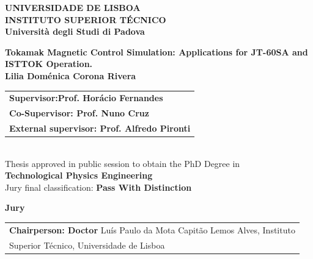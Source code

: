 {%
\centering %
\vspace{-0.5cm}
{\FontL \textbf{UNIVERSIDADE DE LISBOA}} \\
\vspace{10pt}
{\FontL \textbf{INSTITUTO SUPERIOR T\'{E}CNICO}} \\
\vspace{0.7mm}
{\FontM \textbf{Universit\`{a} degli Studi di Padova}} \\
\vspace{0.5cm}

{\FontXL \textbf{Tokamak Magnetic Control Simulation: Applications for JT-60SA and ISTTOK Operation.}} \\

\vspace{0.5cm}
{\FontNam \textbf{Lilia Dom\'enica Corona Rivera}} \\
\vspace{0.7cm}
{\FontS %
	\begin{tabular}{l}
		\FontL
		\textbf{Supervisor:Prof. Hor\'acio Fernandes} \\
		\FontL\textbf{Co-Supervisor: Prof. Nuno Cruz}\\
		\FontL\textbf{External supervisor: Prof. Alfredo Pironti}\\
\end{tabular} } \\
\vspace{0.5cm}
{\FontM Thesis approved in public session to obtain the PhD Degree in} \\
\vspace{0.7mm}
{\FontL \textbf{Technological Physics Engineering}} \\
\vspace{0.6cm}
{\FontL Jury final classification: \textbf{Pass With Distinction}}\\
\vspace{0.6cm}

{\FontL \textbf{Jury}}\\
\vspace{0.4cm}

{\FontS %
	\begin{tabular}{l}
		\FontM
		\textbf{Chairperson: Doctor} Luís Paulo da Mota Capitão Lemos  Alves, Instituto  \\ 	\FontM \hspace{4.5cm} Superior  Técnico,  Universidade  de Lisboa \\
		

\end{tabular}}}
